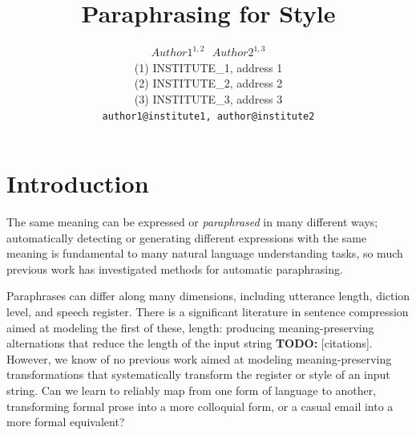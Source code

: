 \documentclass[10pt,a5paper,twoside]{article}
\title{Paraphrasing for Style}
\author{$Author1^{1, 2}~~~Author2^{1, 3}$\\
{\small  	(1) INSTITUTE\_1, address 1\\ 
 		(2) INSTITUTE\_2, address 2\\
		(3) INSTITUTE\_3, address 3\\
  \texttt{author1@institute1, author@institute2} \\ 
}}
\begin{document}
\maketitle


\newpage
\section{Introduction}

The same meaning can be expressed or \emph{paraphrased} in many different ways; automatically detecting or generating different expressions with the same meaning is 
fundamental to many natural language understanding tasks\cite{Giampiccolo07}, so much previous work has investigated methods for automatic paraphrasing\cite{Barzilay03,dolan04,Shinyama03,Das09,bannard05}.  

Paraphrases can differ along many dimensions, including utterance length, diction level, and speech register. 
There is a significant literature in sentence compression aimed at modeling the first of these, length: 
producing meaning-preserving alternations that reduce the length of the input string {\bf TODO:} [citations].
However, we know of no previous work aimed at modeling meaning-preserving transformations that systematically transform the register or style of an input string. 
Can we learn to reliably map from one form of language to another, transforming formal prose into a more colloquial form, or a casual email into a more formal equivalent?
\end{document}
